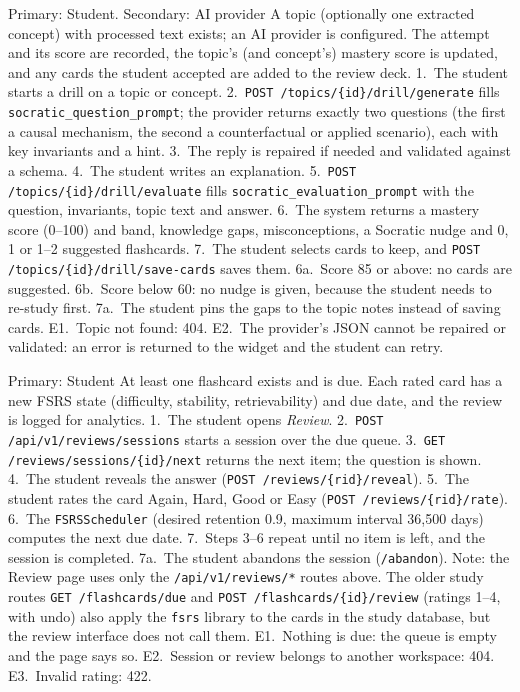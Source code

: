 {Primary: Student. Secondary: AI provider}
{A topic (optionally one extracted concept) with processed text exists; an AI provider is
configured.}
{The attempt and its score are recorded, the topic's (and concept's) mastery score is updated,
and any cards the student accepted are added to the review deck.}
{1.~The student starts a drill on a topic or concept. 2.~\texttt{POST /topics/\{id\}/drill/generate}
fills \texttt{socratic\_question\_prompt}; the provider returns exactly two questions (the first a
causal mechanism, the second a counterfactual or applied scenario), each with key invariants
and a hint. 3.~The reply is repaired if needed and validated against a schema. 4.~The student
writes an explanation. 5.~\texttt{POST /topics/\{id\}/drill/evaluate} fills
\texttt{socratic\_evaluation\_prompt} with the question, invariants, topic text and answer.
6.~The system returns a mastery score (0--100) and band, knowledge gaps, misconceptions, a
Socratic nudge and 0, 1 or 1--2 suggested flashcards. 7.~The student selects cards to keep,
and \texttt{POST /topics/\{id\}/drill/save-cards} saves them.}
{6a.~Score 85 or above: no cards are suggested. 6b.~Score below 60: no nudge is given, because
the student needs to re-study first. 7a.~The student pins the gaps to the topic notes instead
of saving cards.}
{E1.~Topic not found: 404. E2.~The provider's JSON cannot be repaired or validated: an error is
returned to the widget and the student can retry.}

{Primary: Student}
{At least one flashcard exists and is due.}
{Each rated card has a new FSRS state (difficulty, stability, retrievability) and due date, and
the review is logged for analytics.}
{1.~The student opens \emph{Review}. 2.~\texttt{POST /api/v1/reviews/sessions} starts a session over
the due queue. 3.~\texttt{GET /reviews/sessions/\{id\}/next} returns the next item; the question is
shown. 4.~The student reveals the answer (\texttt{POST /reviews/\{rid\}/reveal}). 5.~The student
rates the card Again, Hard, Good or Easy (\texttt{POST /reviews/\{rid\}/rate}). 6.~The
\texttt{FSRSScheduler} (desired retention 0.9, maximum interval 36{,}500 days) computes the next due
date. 7.~Steps 3--6 repeat until no item is left, and the session is completed.}
{7a.~The student abandons the session (\texttt{/abandon}). Note: the Review page uses only the
\texttt{/api/v1/reviews/*} routes above. The older study routes \texttt{GET /flashcards/due} and
\texttt{POST /flashcards/\{id\}/review} (ratings 1--4, with undo) also apply the \texttt{fsrs} library
to the cards in the study database, but the review interface does not call them.}
{E1.~Nothing is due: the queue is empty and the page says so. E2.~Session or review belongs to
another workspace: 404. E3.~Invalid rating: 422.}

